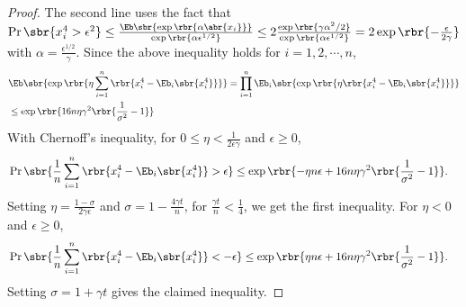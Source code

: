 \documentclass[twoside,11pt]{article}
\begin{document}
{\begin{proof}
  The second line uses the fact that $\Pr \sbr{ x_i^4 > \epsilon^2 } \leq \frac{ \Eb \sbr{\exp\rbr{\alpha \abr{x_i}}}}{ \exp\rbr{\alpha \epsilon^{1/2}}} \leq 2 \frac{\exp\rbr{\gamma \alpha^2/2}}{ \exp\rbr{\alpha \epsilon^{1/2}}} = 2 \exp \rbr{-\frac{\epsilon}{2\gamma} } $ with $\alpha = \frac{\epsilon^{1/2}}{\gamma}$. Since the above inequality holds for $i = 1, 2, \cdots, n$, 
  \begin{align}
    &\Eb \sbr{\exp \rbr{\eta \sum_{i=1}^n \rbr{x_i^4 - \Eb_i \sbr{x_i^4}} } } = \prod \limits_{i=1}^n \Eb_i \sbr{ \exp \rbr{\eta \rbr{x_i^4 - \Eb_i \sbr{x_i^4}} }}\\
    & \leq \exp \rbr{16 n\eta  \gamma^2 \rbr{\frac{1}{\sigma^2}-1 } }
  \end{align}
With Chernoff's inequality, for $0 \leq \eta < \frac{1}{2 \epsilon \gamma}$ and $\epsilon \geq 0$, 
  \begin{align}
    &\Pr \sbr{\frac{1}{n} \sum \limits_{i=1}^n \rbr{x_i^4 - \Eb_i \sbr{x_i^4}} > \epsilon } \leq \exp \rbr{-\eta n \epsilon+16 n\eta  \gamma^2 \rbr{\frac{1}{\sigma^2}-1 }}.
  \end{align}
Setting $\eta = \frac{1-\sigma}{2\gamma\epsilon}$ and $\sigma = 1- \frac{4\gamma t}{n}$, for $\frac{\gamma t}{n} < \frac{1}{4}$, we get the first inequality. For $\eta <0 $ and $\epsilon \geq 0$,
  \begin{align}
    &\Pr \sbr{\frac{1}{n} \sum \limits_{i=1}^n \rbr{x_i^4 - \Eb_i \sbr{x_i^4}} < -\epsilon } \leq \exp \rbr{\eta n \epsilon+16 n\eta  \gamma^2 \rbr{\frac{1}{\sigma^2}-1 }}.
  \end{align}
Setting $\sigma = 1 + \gamma t$ gives the claimed inequality.
  

\end{proof}}
\end{document}
